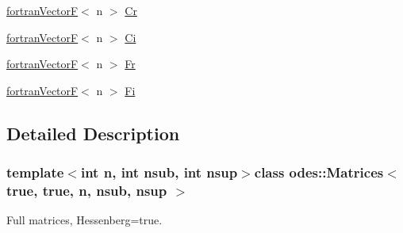 \begin{DoxyCompactItemize}
\item 
\hyperlink{classodes_1_1fortranVectorF}{fortran\-Vector\-F}$<$ n $>$ \hyperlink{classodes_1_1Matrices_3_01true_00_01true_00_01n_00_01nsub_00_01nsup_01_4_a9b0fa0b5ed5e60ea4d2a34c3bcccfdb4}{Cr}
\item 
\hyperlink{classodes_1_1fortranVectorF}{fortran\-Vector\-F}$<$ n $>$ \hyperlink{classodes_1_1Matrices_3_01true_00_01true_00_01n_00_01nsub_00_01nsup_01_4_aa8634c8ad1096a2027f60cd7c90c480f}{Ci}
\item 
\hyperlink{classodes_1_1fortranVectorF}{fortran\-Vector\-F}$<$ n $>$ \hyperlink{classodes_1_1Matrices_3_01true_00_01true_00_01n_00_01nsub_00_01nsup_01_4_abc0c64728be747fdf198936dc511dd0b}{Fr}
\item 
\hyperlink{classodes_1_1fortranVectorF}{fortran\-Vector\-F}$<$ n $>$ \hyperlink{classodes_1_1Matrices_3_01true_00_01true_00_01n_00_01nsub_00_01nsup_01_4_a39f0af29fa7e21db0d0a88581ae291a9}{Fi}
\end{DoxyCompactItemize}


\subsection{Detailed Description}
\subsubsection*{template$<$int n, int nsub, int nsup$>$class odes\-::\-Matrices$<$ true, true, n, nsub, nsup $>$}

Full matrices, Hessenberg=true. 


